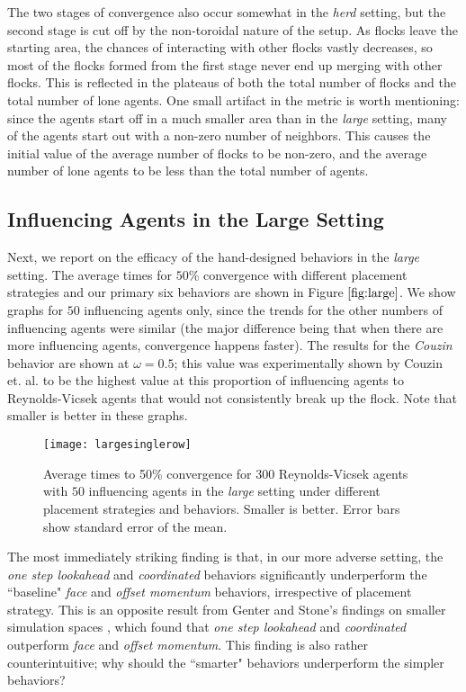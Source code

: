 The two stages of convergence also occur somewhat in the \textit{herd} setting,
but the second stage is cut off by the non-toroidal nature of the setup.
As flocks leave the starting area, the chances of interacting with other flocks
vastly decreases, so most of the flocks formed from the first stage never end up
merging with other flocks.
This is reflected in the plateaus of both the total number of flocks and the total
number of lone agents.
One small artifact in the metric is worth mentioning: since the agents start
off in a much smaller area than in the \textit{large} setting, many of the
agents start out with a non-zero number of neighbors.
This causes the initial value of the average number of flocks to be non-zero, and
the average number of lone agents to be less than the total number of agents.

\subsection{Influencing Agents in the Large Setting}

Next, we report on the efficacy of the hand-designed behaviors in the
\textit{large} setting.
The average times for $50\%$ convergence with different placement strategies
and our primary six behaviors are shown in Figure $\ref{fig:large}$.
We show graphs for $50$ influencing agents only, since the trends for the other
numbers of influencing agents were similar (the major difference being that
when there are more influencing agents, convergence happens faster).
The results for the \textit{Couzin} behavior are shown at $\omega = 0.5$; this
value was experimentally shown by Couzin et. al. to be the highest value at
this proportion of influencing agents to Reynolds-Vicsek agents that would not
consistently break up the flock.
Note that smaller is better in these graphs.
\begin{figure}
    \texttt{[image: largesinglerow]}
    \caption{Average times to 50\% convergence for $300$ Reynolds-Vicsek agents
    with $50$ influencing agents in the \textit{large} setting under different
    placement strategies and behaviors.
    Smaller is better.
    Error bars show standard error of the mean.}
    \label{fig:large}
\end{figure}

The most immediately striking finding is that, in our more adverse setting,
the \textit{one step lookahead} and \textit{coordinated} behaviors
significantly underperform the ``baseline" \textit{face} and
\textit{offset momentum} behaviors, irrespective of placement strategy.
This is an opposite result from Genter and Stone's findings on smaller simulation
spaces \cite{genter201612steplookahead, genterthesis}, which found that
\textit{one step lookahead} and \textit{coordinated} outperform \textit{face}
and \textit{offset momentum}.
This finding is also rather counterintuitive; why should the ``smarter" behaviors
underperform the simpler behaviors?

